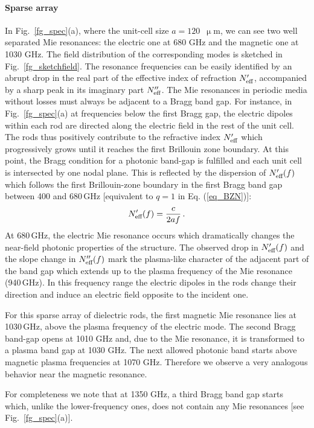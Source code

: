 \paragraph{Sparse array} %
In Fig.~\ref{fg_spec}(a), where the unit-cell size $a=120$~$\upmu$m, we can see two well separated Mie resonances: the electric one at 680 GHz and the magnetic one at 1030 GHz.  The field distribution of the corresponding modes is sketched in Fig.~\ref{fg_sketchfield}. The resonance frequencies can be easily identified by an abrupt drop in the real part of the effective index of refraction $N_{\text{eff} }'$, accompanied by a sharp peak in its imaginary part $N_{\text{eff} }''$. The Mie resonances in periodic media without losses must always be adjacent to a Bragg band gap. For instance, in Fig.~\ref{fg_spec}(a) at frequencies below the first Bragg gap, the electric dipoles within each rod are directed along the electric field in the rest of the unit cell. The rods thus positively contribute to the refractive index $N_{\text{eff} }'$ which progressively grows until it reaches the first Brillouin zone boundary. At this point, the Bragg condition for a photonic band-gap is fulfilled and each unit cell is intersected by one nodal plane. This is reflected by the dispersion of $N_{\text{eff} }'(f)$ which follows the first Brillouin-zone boundary in the first Bragg band gap between 400 and 680\,GHz [equivalent to $q=1$ in Eq. (\ref{eq_BZN})]: $$	N_{\text{eff} }'(f) = \frac{c}{2af}\,. $$ At 680\,GHz, the electric Mie resonance occurs which dramatically changes the near-field photonic properties of the structure. The observed drop in $N_{\text{eff} }'(f)$ and the slope change in $N_{\text{eff} }''(f)$ mark the plasma-like character of the adjacent part of the band gap which extends up to the plasma frequency of the Mie resonance (940\,GHz). In this frequency range the electric dipoles in the rods change their direction and induce an electric field opposite to the incident one.

For this sparse array of dielectric rods, the first magnetic Mie resonance lies at 1030\,GHz, above the plasma frequency of the electric mode.  The second Bragg band-gap opens at 1010 GHz and, due to the Mie resonance, it is transformed to a plasma band gap at 1030 GHz. The next allowed photonic band starts above magnetic plasma frequencies at 1070 GHz. Therefore we observe a very analogous behavior near the magnetic resonance. 

For completeness we note that at 1350 GHz, a third Bragg band gap starts which, unlike the lower-frequency ones, does not contain any Mie resonances [see Fig.\ \ref{fg_spec}(a)].

